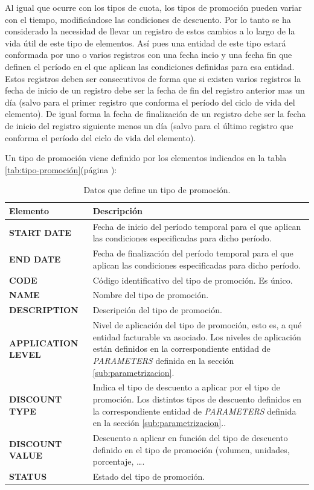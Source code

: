 Al igual que ocurre con los tipos de cuota, los tipos de promoción pueden variar con el tiempo, modificándose las condiciones de descuento. Por lo tanto se ha considerado la necesidad de llevar un registro de estos cambios a lo largo de la vida útil de este tipo de elementos. Así pues una entidad de este tipo estará conformada por uno o varios registros con una fecha incio y una fecha fin que definen el período en el que aplican las condiciones definidas para esa entidad. Estos registros deben ser consecutivos de forma que si existen varios registros la fecha de inicio de un registro debe ser la fecha de fin del registro anterior mas un día (salvo para el primer registro que conforma el período del ciclo de vida del elemento). De igual forma la fecha de finalización de un registro debe ser la fecha de inicio del registro siguiente menos un día (salvo para el último registro que conforma el período del ciclo de vida del elemento).


Un tipo de promoción viene definido por los elementos indicados en la tabla \ref{tab:tipo-promoción}(página \pageref{tab:tipo-promoción}):


\begin{table}[H]
  \centering
  \setlength{\leftmargini}{0.4cm}
  \resizebox{14cm}{!} {
  \begin{tabular}{|m{3cm} m{11cm}|}
  \rowcolor{udcpink!25}
  \hline
  	\textbf{Elemento} & \textbf{Descripción} \\\hline
  	\textbf{START DATE} & Fecha de inicio del período temporal para el que aplican las condiciones especificadas para dicho período.\\
  	\textbf{END DATE} & Fecha de finalización del período temporal para el que aplican las condiciones especificadas para dicho período.\\
  	\textbf{CODE} & Código identificativo del tipo de promoción. Es único.\\
	\textbf{NAME} & Nombre del tipo de promoción.\\
	\textbf{DESCRIPTION} & Descripción del tipo de promoción.\\
	\textbf{APPLICATION LEVEL} & Nivel de aplicación del tipo de promoción, esto es, a qué entidad facturable va asociado. Los niveles de aplicación están definidos en la correspondiente entidad de \emph{PARAMETERS} definida en la sección \ref{sub:parametrizacion}.\\	
	\textbf{DISCOUNT TYPE} & Indica el tipo de descuento a aplicar por el tipo de promoción. Los distintos tipos de descuento definidos en la correspondiente entidad de \emph{PARAMETERS} definida en la sección \ref{sub:parametrizacion}..\\
	\textbf{DISCOUNT VALUE} & Descuento a aplicar en función del tipo de descuento definido en el tipo de promoción (volumen, unidades, porcentaje, \dots.\\
	\textbf{STATUS} & Estado del tipo de promoción.	
	\\\hline
  \end{tabular}
  } %
  \caption{Datos que define un tipo de promoción.}
  \label{tab:tipo-cuota}
\end{table}



